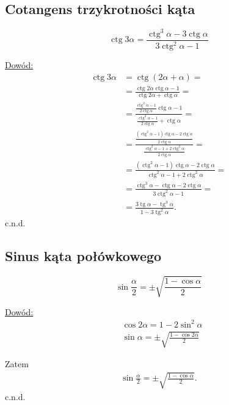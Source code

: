 \documentclass[12pt,a4paper,fleqn]{article}
\DeclareMathOperator{\tg}{tg}
\DeclareMathOperator{\ctg}{ctg}
\begin{document}
		\subsection{Cotangens trzykrotności kąta}
		\begin{equation*}
			\ctg3\alpha = \frac{\ctg^3\alpha - 3\ctg\alpha}{3\ctg^2\alpha-1}
		\end{equation*}
		
		\underline{Dowód:} \noindent
		\begin{align*}
			\ctg3\alpha &= \ctg(2\alpha + \alpha) = \\
					    &= \frac{\ctg2\alpha\ctg\alpha- 1}{\ctg2\alpha+\ctg\alpha} = \\
					   	&= \frac{\frac{\ctg^2\alpha-1}{2\ctg\alpha}\ctg\alpha- 1}{\frac{\ctg^2\alpha-1}{2\ctg\alpha}+\ctg\alpha} = \\
					   	&= \frac{\frac{(\ctg^2\alpha-1)\ctg\alpha-2\ctg\alpha}{2\ctg\alpha}}{\frac{\ctg^2\alpha-1+2\ctg^2\alpha}{2\ctg\alpha}} =\\
					   	&=\frac{(\ctg^2\alpha-1)\ctg\alpha-2\ctg\alpha}{\ctg^2\alpha-1+2\ctg^2\alpha} =\\
					   	&=\frac{\ctg^3\alpha-\ctg\alpha-2\ctg\alpha}{3\ctg^2\alpha-1} =\\
					   	&= \frac{3\tg\alpha-\tg^3\alpha}{1-3\tg^2\alpha}.
		\end{align*}
		c.n.d.

		\subsection{Sinus kąta połówkowego}
		\begin{equation*}
			\sin\frac{\alpha}{2} = \pm \sqrt{\frac{1-\cos\alpha}{2}}
		\end{equation*}
		
		\underline{Dowód:} \noindent
		\begin{align*}
			&\cos 2\alpha = 1 - 2\sin^2\alpha\\
			&\sin\alpha = \pm \sqrt{\frac{1-\cos2\alpha}{2}}
		\end{align*}
		
		Zatem
		\begin{align*}
			\sin\frac{\alpha}{2} = \pm \sqrt{\frac{1-\cos\alpha}{2}}.
		\end{align*}
		c.n.d.
		
\end{document}
